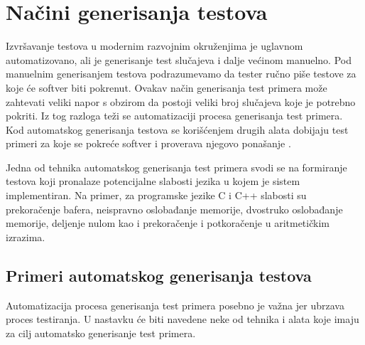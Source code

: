 \documentclass[12pt,oneside]{memoir}
\begin{document}
\section{Načini generisanja testova} \label{broj5}

Izvršavanje testova u modernim razvojnim okruženjima je uglavnom automatizovano, ali je generisanje test slučajeva i dalje većinom manuelno. Pod manuelnim generisanjem testova podrazumevamo da tester ručno piše testove za koje će softver biti pokrenut. Ovakav način generisanja test primera može zahtevati veliki napor s obzirom da postoji veliki broj slučajeva koje je potrebno pokriti. Iz tog razloga teži se automatizaciji procesa generisanja test primera. Kod automatskog generisanja testova se korišćenjem drugih alata dobijaju test primeri za koje se pokreće softver i proverava njegovo ponašanje \cite{AutomatedTestGeneration}. \par
Jedna od tehnika automatskog generisanja test primera svodi se na formiranje testova koji pronalaze potencijalne slabosti jezika u kojem je sistem implementiran.
Na primer, za programske jezike C i C++ slabosti su prekoračenje bafera, neispravno oslobađanje memorije, dvostruko oslobađanje memorije, deljenje nulom kao i prekoračenje i potkoračenje u aritmetičkim izrazima.


\subsection{Primeri automatskog generisanja testova}
Automatizacija procesa generisanja test primera posebno je važna jer ubrzava proces testiranja. U nastavku će biti navedene neke od tehnika i alata koje imaju za cilj automatsko generisanje test primera. 
\end{document}

